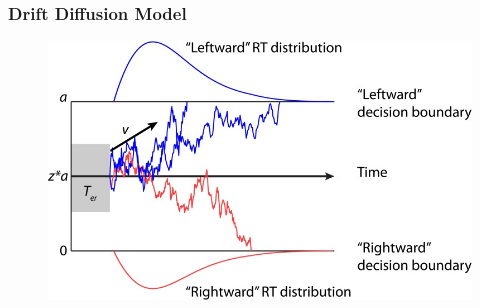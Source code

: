 \documentclass[xcolor=dvipsnames]{beamer} %
\begin{document}
\begin{frame}
  \frametitle{Drift Diffusion Model}
  \begin{figure}[h!]
	  \centering
  	 \includegraphics[width=.8\textwidth]{constantCostDDM.jpg}
  \end{figure}
\end{frame}










\everymath{\displaystyle}
\end{document}
